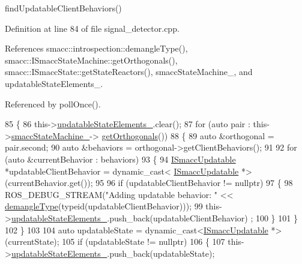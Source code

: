 find\+Updatable\+Client\+Behaviors() 

Definition at line 84 of file signal\+\_\+detector.\+cpp.



References smacc\+::introspection\+::demangle\+Type(), smacc\+::\+I\+Smacc\+State\+Machine\+::get\+Orthogonals(), smacc\+::\+I\+Smacc\+State\+::get\+State\+Reactors(), smacc\+State\+Machine\+\_\+, and updatable\+State\+Elements\+\_\+.



Referenced by poll\+Once().


\begin{DoxyCode}
85     \{
86         this->\hyperlink{classsmacc_1_1SignalDetector_a07a5e7bb00c348435d954e22682fa610}{updatableStateElements\_}.clear();
87         \textcolor{keywordflow}{for} (\textcolor{keyword}{auto} pair : this->\hyperlink{classsmacc_1_1SignalDetector_a46025de6ac7b5980e22144f9703236a4}{smaccStateMachine\_}->
      \hyperlink{classsmacc_1_1ISmaccStateMachine_a7f5b2882dbd077584767cb2533ed3c49}{getOrthogonals}())
88         \{
89             \textcolor{keyword}{auto} &orthogonal = pair.second;
90             \textcolor{keyword}{auto} &behaviors = orthogonal->getClientBehaviors();
91 
92             \textcolor{keywordflow}{for} (\textcolor{keyword}{auto} &currentBehavior : behaviors)
93             \{
94                 \hyperlink{classISmaccUpdatable}{ISmaccUpdatable} *updatableClientBehavior = \textcolor{keyword}{dynamic\_cast<}
      \hyperlink{classISmaccUpdatable}{ISmaccUpdatable} *\textcolor{keyword}{>}(currentBehavior.get());
95 
96                 \textcolor{keywordflow}{if} (updatableClientBehavior != \textcolor{keyword}{nullptr})
97                 \{
98                     ROS\_DEBUG\_STREAM(\textcolor{stringliteral}{"Adding updatable behavior: "} << 
      \hyperlink{namespacesmacc_1_1introspection_a670e39ccea29952859df4e2d0e45077b}{demangleType}(\textcolor{keyword}{typeid}(updatableClientBehavior)));
99                     this->\hyperlink{classsmacc_1_1SignalDetector_a07a5e7bb00c348435d954e22682fa610}{updatableStateElements\_}.push\_back(updatableClientBehavior)
      ;
100                 \}
101             \}
102         \}
103 
104         \textcolor{keyword}{auto} updatableState = \textcolor{keyword}{dynamic\_cast<}\hyperlink{classISmaccUpdatable}{ISmaccUpdatable} *\textcolor{keyword}{>}(currentState);
105         \textcolor{keywordflow}{if} (updatableState != \textcolor{keyword}{nullptr})
106         \{
107             this->\hyperlink{classsmacc_1_1SignalDetector_a07a5e7bb00c348435d954e22682fa610}{updatableStateElements\_}.push\_back(updatableState);

\end{DoxyCode}
